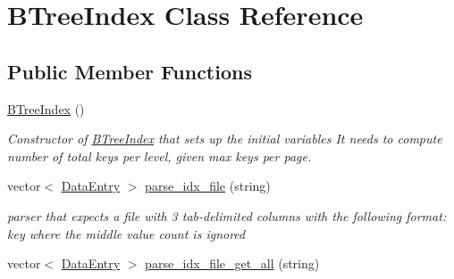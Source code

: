 \hypertarget{class_b_tree_index}{}\section{B\+Tree\+Index Class Reference}
\label{class_b_tree_index}
\subsection*{Public Member Functions}
\begin{DoxyCompactItemize}
\item 
\hypertarget{class_b_tree_index_ae737b5dea98c2e2036fd3b3d9bdcfc22}{}\hyperlink{class_b_tree_index_ae737b5dea98c2e2036fd3b3d9bdcfc22}{B\+Tree\+Index} ()\label{class_b_tree_index_ae737b5dea98c2e2036fd3b3d9bdcfc22}

\begin{DoxyCompactList}\small\item\em Constructor of \hyperlink{class_b_tree_index}{B\+Tree\+Index} that sets up the initial variables It needs to compute number of total keys per level, given max keys per page. \end{DoxyCompactList}\item 
\hypertarget{class_b_tree_index_a6202c61a8541b0f5c13eef1f1a940e31}{}vector$<$ \hyperlink{class_data_entry}{Data\+Entry} $>$ \hyperlink{class_b_tree_index_a6202c61a8541b0f5c13eef1f1a940e31}{parse\+\_\+idx\+\_\+file} (string)\label{class_b_tree_index_a6202c61a8541b0f5c13eef1f1a940e31}

\begin{DoxyCompactList}\small\item\em parser that expects a file with 3 tab-\/delimited columns with the following format\+: key where the middle value count is ignored \end{DoxyCompactList}\item 
\hypertarget{class_b_tree_index_a4a7270c48f911f355442265f1dc340fd}{}vector$<$ \hyperlink{class_data_entry}{Data\+Entry} $>$ \hyperlink{class_b_tree_index_a4a7270c48f911f355442265f1dc340fd}{parse\+\_\+idx\+\_\+file\+\_\+get\+\_\+all} (string)\label{class_b_tree_index_a4a7270c48f911f355442265f1dc340fd}


\end{DoxyCompactItemize}
